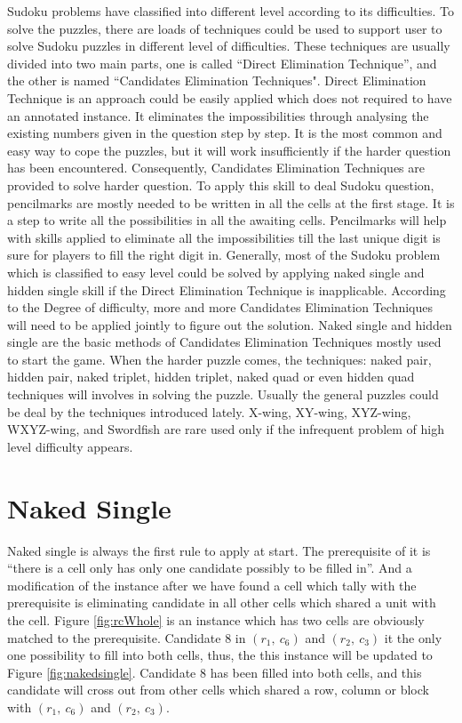 \documentclass[11pt]{report}
\begin{document}
Sudoku problems have classified into different level according to its difficulties. To solve the puzzles, there are loads of techniques could be used to support user to solve Sudoku puzzles in different level of difficulties. These techniques are usually divided into two main parts, one is called “Direct Elimination Technique”, and the other is named “Candidates Elimination Techniques".
Direct Elimination Technique is an approach could be easily applied which does not required to have an annotated instance. It eliminates the impossibilities through analysing the existing numbers given in the question step by step. It is the most common and easy way to cope the puzzles, but it will work insufficiently if the harder question has been encountered. 
Consequently, Candidates Elimination Techniques are provided to solve harder question. To apply this skill to deal Sudoku question, pencilmarks are mostly needed to be written in all the cells at the first stage. It is a step to write all the possibilities in all the awaiting cells. Pencilmarks will help with skills applied to eliminate all the impossibilities till the last unique digit is sure for players to fill the right digit in.
Generally, most of the Sudoku problem which is classified to easy level could be solved by applying naked single and hidden single skill if the Direct Elimination Technique is inapplicable. According to the Degree of difficulty, more and more Candidates Elimination Techniques will need to be applied jointly to figure out the solution. 
Naked single and hidden single are the basic methods of Candidates Elimination Techniques mostly used to start the game. When the harder puzzle comes, the techniques: naked pair, hidden pair, naked triplet, hidden triplet, naked quad or even hidden quad techniques will involves in solving the puzzle. Usually the general puzzles could be deal by the techniques introduced lately. X-wing, XY-wing, XYZ-wing, WXYZ-wing, and Swordfish are rare used only if the infrequent problem of high level difficulty appears. 



\section{Naked Single}
\label{sec:Nakedsingle}

Naked single is always the first rule to apply at start. The prerequisite of it is ``there is a cell only has only one candidate possibly to be filled in''. And a modification of the instance after we have found a cell which tally with the prerequisite is eliminating candidate in all other cells which shared a unit with the cell. Figure \ref{fig:rcWhole} is an instance which has two cells are obviously matched to the prerequisite. Candidate 8 in $(r_{1},\ c_{6})$ and $(r_{2},\ c_{3})$ it the only one possibility to fill into both cells, thus, the this instance will be updated to Figure \ref{fig:nakedsingle}. Candidate 8 has been filled into both cells, and this candidate will cross out from other cells which shared a row, column or block with $(r_{1},\ c_{6})$ and $(r_{2},\ c_{3})$.
\end{document}
